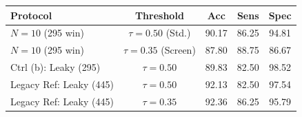 \begin{tabular}{@{}lcccc@{}}
\toprule
\textbf{Protocol} & \textbf{Threshold} & \textbf{Acc} & \textbf{Sens} & \textbf{Spec} \\
\midrule
$N=10$ (295 win) & $\tau = 0.50$ (Std.)  & 90.17 & 86.25 & 94.81 \\
$N=10$ (295 win) & $\tau = 0.35$ (Screen) & 87.80 & 88.75 & 86.67 \\
\midrule
Ctrl (b): Leaky (295) & $\tau = 0.50$ & 89.83 & 82.50 & 98.52 \\
Legacy Ref: Leaky (445) & $\tau = 0.50$ & 92.13 & 82.50 & 97.54 \\
Legacy Ref: Leaky (445) & $\tau = 0.35$ & 92.36 & 86.25 & 95.79 \\
\bottomrule
\end{tabular}
